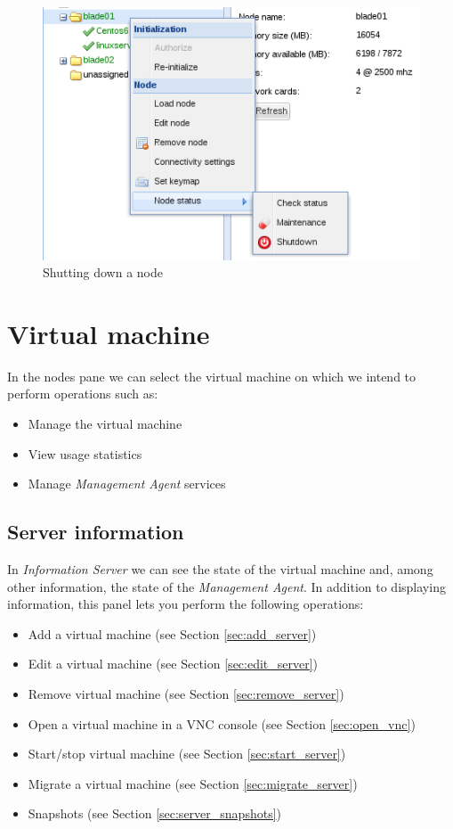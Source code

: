 \begin{figure}[H]
        \begin{center}
        \includegraphics[scale=0.45]{screenshots/shutdownnode.png}
        \caption{Shutting down a node}
        \label{fig:storage_lv_ctx}
        \end{center}
\end{figure}


\pagebreak

\section{Virtual machine}
\label{sec:server}
In the nodes pane we can select the virtual machine on which we intend to perform operations such as:

\begin{itemize}
        \item Manage the virtual machine
        \item View usage statistics 
        \item Manage \emph{Management Agent} services
\end{itemize}

\subsection{Server information}
In \emph{Information Server} we can see the state of the virtual machine and, among other information, the state of the \emph{Management Agent}.
In addition to displaying information, this panel lets you perform the following operations:

\begin{itemize}
	\item Add a virtual machine (see Section \ref{sec:add_server})
    \item Edit a virtual machine (see Section \ref{sec:edit_server})
	\item Remove virtual machine (see Section \ref{sec:remove_server})
	\item Open a virtual machine in a VNC console (see Section \ref{sec:open_vnc})
	\item Start/stop virtual machine (see Section \ref{sec:start_server})
    \item Migrate a virtual machine (see Section \ref{sec:migrate_server})
    \item Snapshots (see Section \ref{sec:server_snapshots})
\end{itemize}

